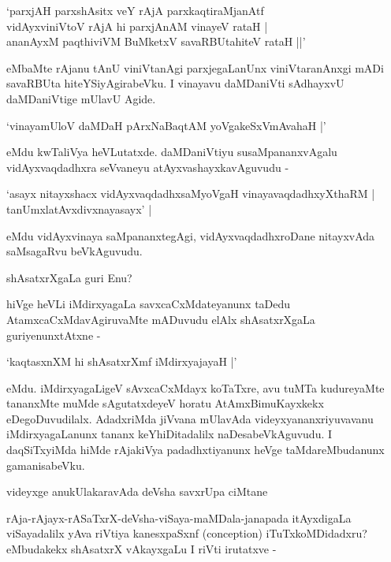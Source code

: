 \begin{shloka}
`parxjAH parxshAsitx veY rAjA parxkaqtiraMjanAtf\\
vidAyxviniVtoV rAjA hi parxjAnAM vinayeV rataH |\\

ananAyxM paqthiviVM BuMketxV savaRBUtahiteV rataH ||'
\end{shloka}

eMbaMte rAjanu tAnU viniVtanAgi parxjegaLanUnx viniVtaranAnxgi mADi savaRBUta hiteYSiyAgirabeVku. I vinayavu daMDaniVti sAdhayxvU daMDaniVtige mUlavU Agide.

\begin{shloka}
`vinayamUloV daMDaH pArxNaBaqtAM yoVgakeSxVmAvahaH |'
\end{shloka}

eMdu kwTaliVya heVLutatxde. daMDaniVtiyu susaMpananxvAgalu vidAyxvaqdadhxra seVvaneyu atAyxvashayxkavAguvudu -

\begin{shloka}
`asayx nitayxshacx vidAyxvaqdadhxsaMyoVgaH vinayavaqdadhxyXthaRM |\\
tanUmxlatAvxdivxnayasayx' |
\end{shloka}

eMdu vidAyxvinaya saMpananxtegAgi, vidAyxvaqdadhxroDane nitayxvAda saMsagaRvu beVkAguvudu.

shAsatxrXgaLa guri Enu?

hiVge heVLi iMdirxyagaLa savxcaCxMdateyanunx taDedu AtamxcaCxMdavAgiruvaMte mADuvudu elAlx shAsatxrXgaLa guriyenunxtAtxne -

\begin{shloka}
`kaqtasxnXM hi shAsatxrXmf iMdirxyajayaH |'
\end{shloka}

eMdu. iMdirxyagaLigeV sAvxcaCxMdayx koTaTxre, avu tuMTa kudureyaMte tananxMte muMde sAgutatxdeyeV horatu AtAmxBimuKayxkekx eDegoDuvudilalx. AdadxriMda jiVvana mUlavAda videyxyananxriyuvavanu iMdirxyagaLanunx tananx keYhiDitadalilx naDesabeVkAguvudu. I daqSiTxyiMda hiMde rAjakiVya padadhxtiyanunx heVge taMdareMbudanunx gamanisabeVku.

videyxge anukUlakaravAda deVsha savxrUpa ciMtane

rAja-rAjayx-rASaTxrX-deVsha-viSaya-maMDala-janapada itAyxdigaLa viSayadalilx yAva riVtiya kanesxpaSxnf ({\rm conception}) iTuTxkoMDidadxru? eMbudakekx shAsatxrX vAkayxgaLu I riVti irutatxve -

